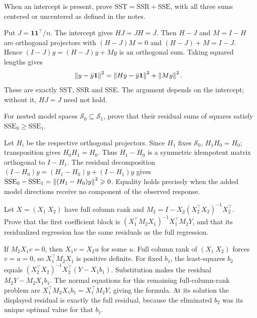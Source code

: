 \begin{problem}
When an intercept is present, prove $\mathrm{SST}=\mathrm{SSR}+\mathrm{SSE}$,
with all three sums centered or uncentered as defined in the notes.
\end{problem}
\begin{solution}
Put $J=\mathbf1\mathbf1^\top/n$. The intercept gives $HJ=JH=J$.
Then $H-J$ and $M=I-H$ are orthogonal projectors with
$(H-J)M=0$ and $(H-J)+M=I-J$. Hence
$(I-J)y=(H-J)y+My$ is an orthogonal sum. Taking squared lengths gives
\[
\left\lVert y-\bar y\mathbf1\right\rVert^2
=\left\lVert Hy-\bar y\mathbf1\right\rVert^2+\left\lVert My\right\rVert^2.
\]
These are exactly SST, SSR and SSE. The argument depends on the intercept;
without it, $HJ=J$ need not hold.
\end{solution}

\begin{problem}
For nested model spaces $\mathcal S_0\subseteq\mathcal S_1$, prove that
their residual sums of squares satisfy $\mathrm{SSE}_0\geqslant\mathrm{SSE}_1$.
\end{problem}
\begin{solution}
Let $H_i$ be the respective orthogonal projectors. Since $H_1$ fixes
$\mathcal S_0$, $H_1H_0=H_0$; transposition gives $H_0H_1=H_0$.
Thus $H_1-H_0$ is a symmetric idempotent matrix orthogonal to $I-H_1$.
The residual decomposition
$(I-H_0)y=(H_1-H_0)y+(I-H_1)y$ gives
$\mathrm{SSE}_0-\mathrm{SSE}_1=\left\lVert(H_1-H_0)y\right\rVert^2\geqslant0$.
Equality holds precisely when the added model directions receive no
component of the observed response.
\end{solution}

\begin{problem}\label{ex:11:fwl}
Let $X=(X_1\ X_2)$ have full column rank and
$M_2=I-X_2(X_2^\top X_2)^{-1}X_2^\top$.
Prove that the first coefficient block is
$(X_1^\top M_2X_1)^{-1}X_1^\top M_2Y$, and that its residualized
regression has the same residuals as the full regression.
\end{problem}
\begin{solution}
If $M_2X_1v=0$, then $X_1v=X_2u$ for some $u$. Full column rank of
$(X_1\ X_2)$ forces $v=u=0$, so $X_1^\top M_2X_1$ is positive definite.
For fixed $b_1$, the least-squares $b_2$ equals
$(X_2^\top X_2)^{-1}X_2^\top(Y-X_1b_1)$.
Substitution makes the residual $M_2Y-M_2X_1b_1$.
The normal equations for this remaining full-column-rank problem are
$X_1^\top M_2X_1b_1=X_1^\top M_2Y$, giving the formula.
At its solution the displayed residual is exactly the full residual,
because the eliminated $b_2$ was its unique optimal value for that $b_1$.
\end{solution}

